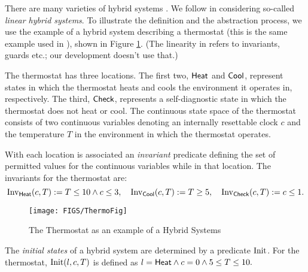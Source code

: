\documentclass[runningheads]{llncs}
\newcommand{\weg}[1]{}
\newcommand{\Heat}{{\sf Heat}}
\newcommand{\Cool}{{\sf Cool}}
\newcommand{\Chec}{{\sf Check}}
\newcommand{\Inv}{{\rm Inv}}
\newcommand{\Init}{{\rm Init}}
\begin{document}
There are many varieties of hybrid systems
\cite{henziger,lynchvaandrager}. We follow \cite{alur} in considering
so-called \emph{linear hybrid systems}\weg{ (to be defined
  momentarily)}. To illustrate the definition and the abstraction
process, we use the example of a hybrid system describing
a thermostat (this is the same example used in \cite{alur}), shown
in Figure \ref{fig:thermostat}. (The linearity in \cite{alur} refers
to invariants, guards etc.; our development doesn't use that.)





The thermostat has three locations. The first two, $\Heat$ and $\Cool$, represent states in which the thermostat heats and cools the environment it operates in, respectively. The third, $\Chec$, represents a self-diagnostic state in which the thermostat does not heat or cool. The continuous state space of the thermostat consists of two continuous variables denoting an internally resettable clock $c$ and the temperature $T$ in the environment in which the thermostat operates.

With each location is associated an \emph{invariant} predicate defining the set of
permitted values for the continuous variables while in that location. The invariants for the thermostat are: $$\Inv_{\Heat}(c,T) :=  T\leq 10 \wedge c\leq 3,\quad \Inv_{\Cool}(c,T) := T \geq 5,\quad \Inv_{\Chec}(c,T) := c\leq 1.$$

\begin{center}
\begin{figure}[htb!]
\begin{center}
    \texttt{[image: FIGS/ThermoFig]}
\end{center}
\caption{The Thermostat as an example of a Hybrid Systems \label{fig:thermostat}}
\end{figure}
\end{center}


The \emph{initial states} of a hybrid system are determined by a predicate $\Init$. For the thermostat,
$\Init(l,c,T)$ is defined as $l= \Heat \wedge c= 0 \wedge 5 \leq T \leq 10.$
\end{document}
